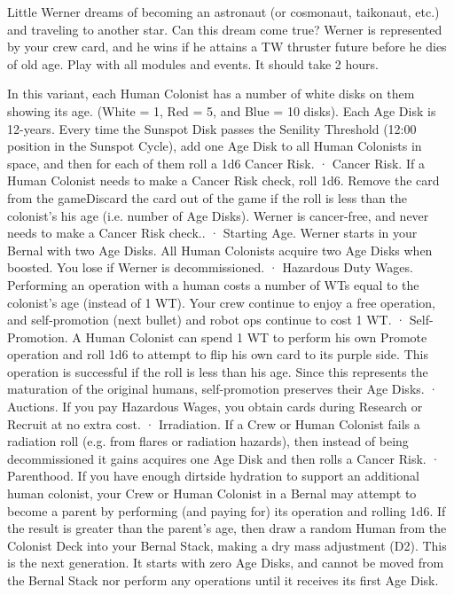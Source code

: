 \documentclass[a4paper]{book}
\begin{document}
Little Werner dreams of becoming an astronaut (or cosmonaut, taikonaut, etc.) and traveling to another star. Can this dream come true? Werner is represented by your crew card, and he wins if he attains a TW thruster future before he dies of old age. Play with all modules and events. It should take 2 hours.
 
In this variant, each Human Colonist has a number of white disks on them showing its age. (White = 1, Red = 5, and Blue = 10 disks). Each Age Disk is 12-years. Every time the Sunspot Disk passes the Senility Threshold (12:00 position in the Sunspot Cycle), add one Age Disk to all Human Colonists in space, and then for each of them roll a 1d6 Cancer Risk.
·       Cancer Risk. If a Human Colonist needs to make a Cancer Risk check, roll 1d6. Remove the card from the gameDiscard the card out of the game if the roll is less than the colonist’s his age (i.e. number of Age Disks). Werner is cancer-free, and never needs to make a Cancer Risk check..
·       Starting Age. Werner starts in your Bernal with two Age Disks. All Human Colonists acquire two Age Disks when boosted. You lose if Werner is decommissioned.
·       Hazardous Duty Wages. Performing an operation with a human costs a number of WTs equal to the colonist’s age (instead of 1 WT). Your crew continue to enjoy a free operation, and self-promotion (next bullet) and robot ops continue to cost 1 WT.
·       Self-Promotion. A Human Colonist can spend 1 WT to perform his own Promote operation and roll 1d6 to attempt to flip his own card to its purple side. This operation is successful if the roll is less than his age. Since this represents the maturation of the original humans, self-promotion preserves their Age Disks.
·       Auctions. If you pay Hazardous Wages, you obtain cards during Research or Recruit at no extra cost.
·       Irradiation. If a Crew or Human Colonist fails a radiation roll (e.g. from flares or radiation hazards), then instead of being decommissioned it gains acquires one Age Disk and then rolls a Cancer Risk.
·       Parenthood. If you have enough dirtside hydration to support an additional human colonist, your Crew or Human Colonist in a Bernal may attempt to become a parent by performing (and paying for) its operation and rolling 1d6. If the result is greater than the parent’s age, then draw a random Human from the Colonist Deck into your Bernal Stack, making a dry mass adjustment (D2). This is the next generation. It starts with zero Age Disks, and cannot be moved from the Bernal Stack nor perform any operations until it receives its first Age Disk.
\end{document}
